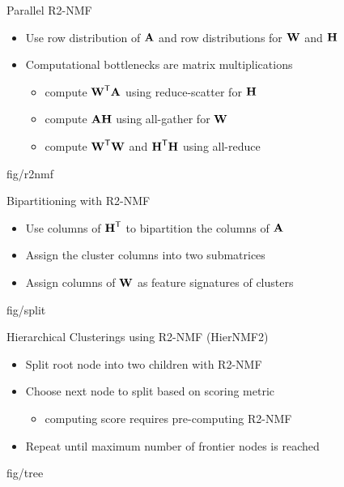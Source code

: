 \documentclass{beamer}
\begin{document}
\begin{frame}{Parallel R2-NMF}
    \begin{itemize}
        \item Use row distribution of $\M{A}$ and row distributions for $\M{W}$ and $\M{H}$ 
        \item Computational bottlenecks are matrix multiplications
        \begin{itemize}
            \item compute $\M{W}^\Tra\M{A}$ using reduce-scatter for $\M{H}$
            \item compute $\M{A}\M{H}$ using all-gather for $\M{W}$
            \item compute $\M{W}^\Tra\M{W}$ and $\M{H}^\Tra\M{H}$ using all-reduce
        \end{itemize}
    \end{itemize}
        {fig/r2nmf}
\end{frame}

\begin{frame}{Bipartitioning with R2-NMF}
    \begin{itemize}
        \item Use columns of $\M{H}^\Tra$ to bipartition the columns of $\M{A}$
        \item Assign the cluster columns into two submatrices
        \item Assign columns of $\M{W}$ as feature signatures of clusters
    \end{itemize}
    \begin{adjustbox}{max totalsize={.7\textwidth}{.6\textheight},center}
        {fig/split}
    \end{adjustbox}
\end{frame}

\begin{frame}{Hierarchical Clusterings using R2-NMF (HierNMF2)}
    \begin{itemize}
        \item Split root node into two children with R2-NMF
        \item Choose next node to split based on scoring metric
        \begin{itemize}
        		\item computing score requires pre-computing R2-NMF
	\end{itemize}
        \item Repeat until maximum number of frontier nodes is reached
    \end{itemize}
    \begin{adjustbox}{max totalsize={.7\textwidth}{.6\textheight},center}
        {fig/tree}
    \end{adjustbox}
\end{frame}
\end{document}
